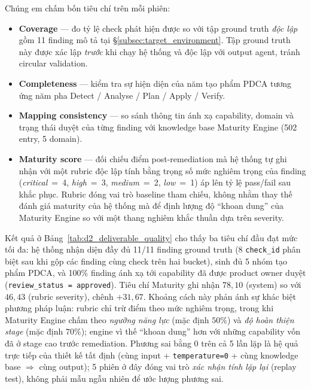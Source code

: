 Chúng em chấm bốn tiêu chí trên mỗi phiên:
\begin{itemize}
  \item \textbf{Coverage} --- đo tỷ lệ check phát hiện được so với tập ground truth \emph{độc lập} gồm 11 finding mô tả tại \S\ref{subsec:target_environment}. Tập ground truth này được xác lập \emph{trước} khi chạy hệ thống và độc lập với output agent, tránh circular validation.
  \item \textbf{Completeness} --- kiểm tra sự hiện diện của năm tạo phẩm PDCA tương ứng năm pha Detect / Analyse / Plan / Apply / Verify.
  \item \textbf{Mapping consistency} --- so sánh thông tin ánh xạ capability, domain và trạng thái duyệt của từng finding với knowledge base Maturity Engine (502 entry, 5 domain).
  \item \textbf{Maturity score} --- đối chiếu điểm post-remediation mà hệ thống tự ghi nhận với một rubric độc lập tính bằng trọng số mức nghiêm trọng của finding (\textit{critical}~=~4, \textit{high}~=~3, \textit{medium}~=~2, \textit{low}~=~1) áp lên tỷ lệ pass/fail sau khắc phục. Rubric đóng vai trò baseline tham chiếu, không nhằm thay thế đánh giá maturity của hệ thống mà để định lượng độ ``khoan dung'' của Maturity Engine so với một thang nghiêm khắc thuần dựa trên severity.
\end{itemize}



Kết quả ở Bảng~\ref{tab:d2_deliverable_quality} cho thấy ba tiêu chí đầu đạt mức tối đa: hệ thống nhận diện đầy đủ 11/11 finding ground truth (8 \texttt{check\_id} phân biệt sau khi gộp các finding cùng check trên hai bucket), sinh đủ 5 nhóm tạo phẩm PDCA, và 100\% finding ánh xạ tới capability đã được product owner duyệt (\texttt{review\_status = approved}). Tiêu chí Maturity ghi nhận $78{,}10$ (system) so với $46{,}43$ (rubric severity), chênh $+31{,}67$. Khoảng cách này phản ánh sự khác biệt phương pháp luận: rubric chỉ trừ điểm theo mức nghiêm trọng, trong khi Maturity Engine chấm theo \emph{ngưỡng năng lực} (mặc định $50\%$) và \emph{độ hoàn thiện stage} (mặc định $70\%$); engine vì thế ``khoan dung'' hơn với những capability vốn đã ở stage cao trước remediation. Phương sai bằng 0 trên cả 5 lần lặp là hệ quả trực tiếp của thiết kế tất định (cùng input + \texttt{temperature=0} + cùng knowledge base $\Rightarrow$ cùng output); 5 phiên ở đây đóng vai trò \emph{xác nhận tính lặp lại} (replay test), không phải mẫu ngẫu nhiên để ước lượng phương sai.

